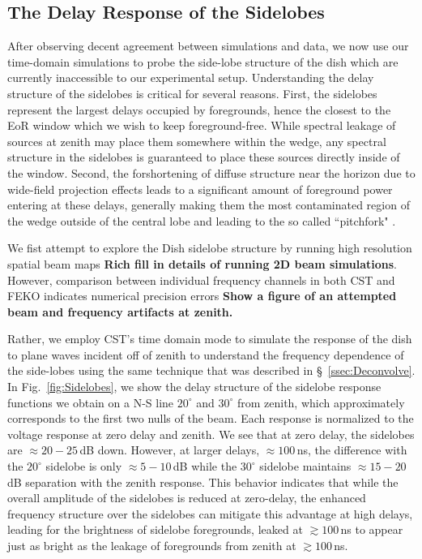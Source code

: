 \documentclass[onecolumn]{emulateapj}
\begin{document}
\subsection{The Delay Response of the Sidelobes}
 After observing decent agreement between simulations and data, we now use our time-domain simulations to probe the side-lobe structure of the dish which are currently inaccessible to our experimental setup. Understanding the delay structure of the sidelobes is critical for several reasons. First, the sidelobes represent the largest delays occupied by foregrounds, hence the closest to the EoR window which we wish to keep foreground-free. While spectral leakage of sources at zenith may place them somewhere within the wedge, any spectral structure in the sidelobes is guaranteed to place these sources directly inside of the window. Second, the forshortening of diffuse structure near the horizon due to wide-field projection effects leads to a significant amount of foreground power entering at these delays, generally making them the most contaminated region of the wedge outside of the central lobe and leading to the so called ``pitchfork" \citep{Thyagarajan:2015a,Thyagarajan:2015b}. 
 
 We fist attempt to explore the Dish sidelobe structure by running high resolution spatial beam maps {\bf Rich fill in details of running 2D beam simulations}. However, comparison between individual frequency channels in both CST and FEKO indicates numerical precision errors {\bf Show a figure of an attempted beam and frequency artifacts at zenith.}
 

Rather, we employ CST's time domain mode to simulate the response of the dish to plane waves incident off of zenith to understand the frequency dependence of the side-lobes using the same technique that was described in \S~\ref{ssec:Deconvolve}. In Fig.~\ref{fig:Sidelobes}, we show the delay structure of the sidelobe response functions we obtain on a N-S line $20^\circ$ and $30^\circ$ from zenith, which approximately corresponds to the first two nulls of the beam. Each response is normalized to the voltage response at zero delay and zenith. We see that at zero delay, the sidelobes are $\approx 20-25$\,dB down. However, at larger delays, $\approx 100$\,ns, the difference with the $20^\circ$ sidelobe is only $\approx 5-10$\,dB while the $30^\circ$ sidelobe maintains $\approx 15-20$\,dB separation with the zenith response. This behavior indicates that while the overall amplitude of the sidelobes is reduced at zero-delay, the enhanced frequency structure over the sidelobes can mitigate this advantage at high delays, leading for the brightness of sidelobe foregrounds, leaked at $\gtrsim 100$\,ns to appear just as bright as the leakage of foregrounds from zenith at $\gtrsim 100$\,ns.
\end{document}
